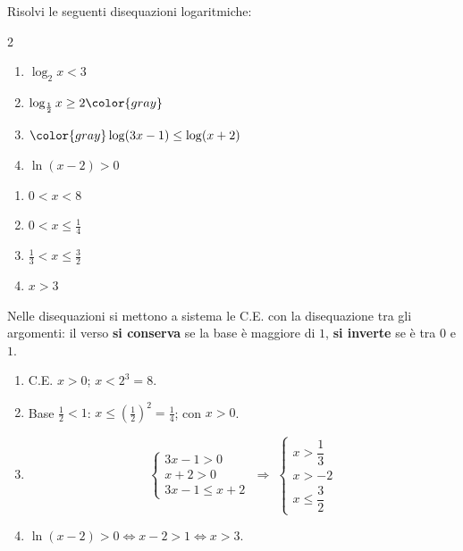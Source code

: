 
\begin{question}[ID=3.2, subtitle={Disequazioni logaritmiche elementari (variante)}, difficulty=facile, tags={disequazioni logaritmiche, definizione}]
Risolvi le seguenti disequazioni logaritmiche:
\begin{center}\begin{minipage}{0.92\linewidth}
\begin{multicols}{2}
\begin{enumerate}[leftmargin=3.2cm]
\item $\log_2 x < 3$
\item $\log_{\frac{1}{2}} x \geq 2 \color{gray}$
\item $\color{gray}\log(3x-1) \leq \log(x+2)$
\item $\ln(x-2) > 0$
\end{enumerate}
\end{multicols}
\end{minipage}\end{center}
\begin{solution}
\begin{enumerate}
    \item $0<x<8$
    \item $0<x\leq\tfrac14$
    \item $\tfrac13<x\leq\tfrac32$
    \item $x>3$
\end{enumerate}
\end{solution}
\begin{explanation}
Nelle disequazioni si mettono a sistema le C.E. con la disequazione tra gli argomenti: il verso \textbf{si conserva} se la base è maggiore di $1$, \textbf{si inverte} se è tra $0$ e $1$.
\begin{enumerate}
    \item C.E. $x>0$; $x<2^3=8$.
    \item Base $\tfrac12<1$: $x\leq\left(\tfrac12\right)^2=\tfrac14$; con $x>0$.
    \item \[ \begin{cases} 3x-1>0\\ x+2>0\\ 3x-1\leq x+2 \end{cases} \;\Rightarrow\; \begin{cases} x>\dfrac13\\ x>-2\\ x\leq\dfrac32 \end{cases} \]
    \item $\ln(x-2)>0 \iff x-2>1 \iff x>3$.
\end{enumerate}
\end{explanation}
\end{question}

